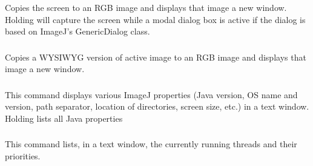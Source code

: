 

\subsubsection{\protect{}\label{sub:Capture-Screen-[g]}}

Copies the screen to an RGB image and displays that image a new window.
Holding    
will capture the screen while a modal dialog box is active if the
dialog is based on ImageJ's GenericDialog class. 




\subsubsection{\protect{}\label{sub:Capture-Image}}

Copies a WYSIWYG version of active image to an RGB image and displays
that image a new window.




\subsubsection{\protect{}\label{sub:ImageJ-Properties...}}

This command displays various ImageJ properties (Java version, OS
name and version, path separator, location of directories, screen
size, etc.) in a text window. Holding 
lists all Java properties




\subsubsection{\protect{}\label{sub:Threads...}}

This command lists, in a text window, the currently running threads
and their priorities.


